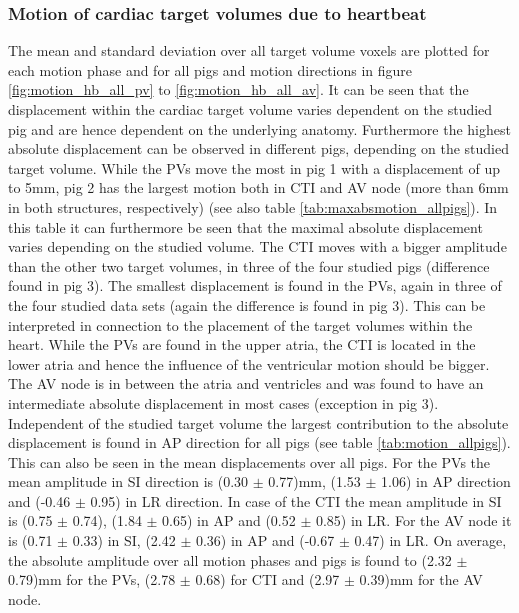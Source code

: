 \documentclass[type=dr, dr=rernat, accentcolor=tud7b,colorbacktitle, bigchapter, openright, twoside, 12pt ]{tudthesis}
\begin{document}


\subsubsection*{Motion of cardiac target volumes due to heartbeat}
\label{Sec:Motion_pigs}


The mean and standard deviation over all target volume voxels are plotted for each motion phase and for all pigs and motion directions in figure 
\ref{fig:motion_hb_all_pv} to \ref{fig:motion_hb_all_av}. It can be seen that the displacement within the cardiac target volume varies 
dependent on the studied pig and are hence dependent on the underlying anatomy. Furthermore the highest absolute displacement can be observed 
in different pigs, depending on the studied target volume. While the PVs move the most in pig 1 with a displacement of up to 5mm, pig 2 has the 
largest motion both in CTI and AV node (more than 6mm in both structures, respectively) (see also table \ref{tab:maxabsmotion_allpigs}). 
In this table it can furthermore be seen that the maximal absolute displacement varies depending on the studied volume. The  
CTI moves with a bigger amplitude than the other two target volumes, in three of the four studied pigs (difference found in pig 3). 
The smallest displacement is found in the PVs, again in three of the four studied data sets (again the difference is found in pig 3). 
This can be interpreted in connection to the placement of the target volumes within the heart. While the PVs are found in the upper atria, 
the CTI is located in the lower atria and hence the influence of the ventricular motion should be bigger. The AV node is in between 
the atria and ventricles and was found to have an intermediate absolute displacement in most cases (exception in pig 3).
Independent of the studied target volume the largest contribution to the absolute displacement is found in AP direction for all pigs 
(see table \ref{tab:motion_allpigs}). This can also be seen in the mean displacements over all pigs. 
For the PVs the mean amplitude in SI direction is (0.30 $\pm$ 0.77)mm, (1.53 $\pm$ 1.06) in AP direction and (-0.46 $\pm$ 0.95) in LR 
direction. In case of the CTI the mean amplitude in SI is (0.75 $\pm$ 0.74), (1.84 $\pm$ 0.65) in AP and (0.52 $\pm$ 0.85) in LR. For the AV 
node it is (0.71 $\pm$ 0.33) in SI, (2.42 $\pm$ 0.36) in AP and (-0.67  $\pm$ 0.47) in LR. On average, the absolute amplitude over all motion 
phases and pigs is found to (2.32 $\pm$ 0.79)mm for the PVs, (2.78 $\pm$ 0.68) for CTI and (2.97 $\pm$ 0.39)mm for the AV node.\newline
\end{document}

